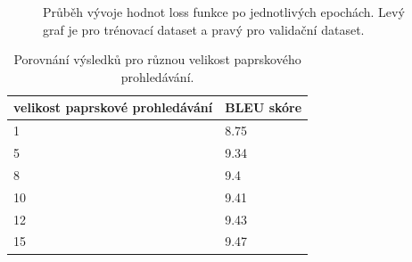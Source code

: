 \begin{figure}[H]
    \begin{center}
    \end{center}
	\caption{Průběh vývoje hodnot loss funkce po jednotlivých epochách. Levý graf je pro trénovací dataset a pravý pro validační dataset.}
\end{figure}

\begin{table}[H]
    \begin{center}
        \begin{tabular}{ll}
          \toprule
          velikost paprskové prohledávání & BLEU skóre \\
          \midrule
          1 & 8.75 \\
          5 & 9.34 \\
          8 & 9.4 \\
          10 & 9.41 \\
          12 & 9.43 \\
          15 & 9.47 \\
          \bottomrule
        \end{tabular}
    \end{center}
	\caption{Porovnání výsledků pro různou velikost paprskového prohledávání.}
	\label{table:resultsExperiment4}
\end{table}

